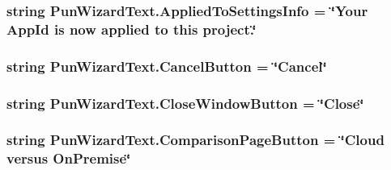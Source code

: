 \subsubsection[{\texorpdfstring{Applied\+To\+Settings\+Info}{AppliedToSettingsInfo}}]{\setlength{\rightskip}{0pt plus 5cm}string Pun\+Wizard\+Text.\+Applied\+To\+Settings\+Info = \char`\"{}Your App\+Id is now applied to this project.\char`\"{}}\hypertarget{class_pun_wizard_text_af582ba8445fcb5925fa47644b5454353}{}\label{class_pun_wizard_text_af582ba8445fcb5925fa47644b5454353}
\subsubsection[{\texorpdfstring{Cancel\+Button}{CancelButton}}]{\setlength{\rightskip}{0pt plus 5cm}string Pun\+Wizard\+Text.\+Cancel\+Button = \char`\"{}Cancel\char`\"{}}\hypertarget{class_pun_wizard_text_ad647358b4b8a0519d87fbdeb24a6d6e0}{}\label{class_pun_wizard_text_ad647358b4b8a0519d87fbdeb24a6d6e0}
\subsubsection[{\texorpdfstring{Close\+Window\+Button}{CloseWindowButton}}]{\setlength{\rightskip}{0pt plus 5cm}string Pun\+Wizard\+Text.\+Close\+Window\+Button = \char`\"{}Close\char`\"{}}\hypertarget{class_pun_wizard_text_ac309bbb1df1a12df4f603ebf0f80de1b}{}\label{class_pun_wizard_text_ac309bbb1df1a12df4f603ebf0f80de1b}
\subsubsection[{\texorpdfstring{Comparison\+Page\+Button}{ComparisonPageButton}}]{\setlength{\rightskip}{0pt plus 5cm}string Pun\+Wizard\+Text.\+Comparison\+Page\+Button = \char`\"{}Cloud versus On\+Premise\char`\"{}}\hypertarget{class_pun_wizard_text_a606184854a665f62de5fb491443cd51b}{}\label{class_pun_wizard_text_a606184854a665f62de5fb491443cd51b}
